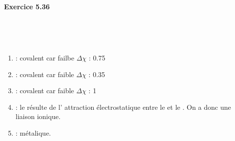 \documentclass{article}
\newcommand\exercice[1]{%
\paragraph{#1}%
~\par
~\par}
\begin{document}
\exercice{Exercice 5.36}

\begin{enumerate}\renewcommand{\theenumi}{\alph{enumi}}
	\item	{} : covalent car failbe $\Delta \chi$ : 0.75
	\item	{} : covalent car faible $\Delta \chi$ : 0.35
	\item	{} : covalent car faible $\Delta \chi$ : 1
	\item	{} : le  résulte de l'
				attraction électrostatique entre le 
				et le . On a donc une liaison ionique.
	\item	{} : métalique.
\end{enumerate}	
				
\end{document}
